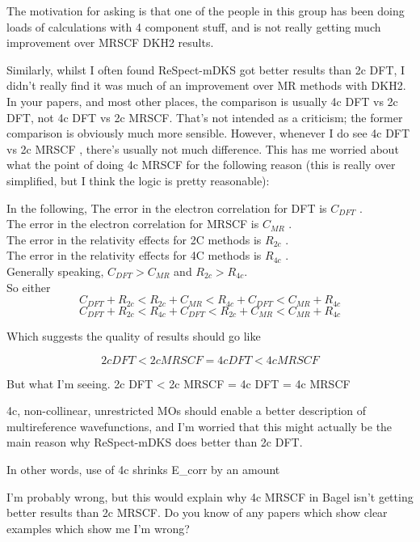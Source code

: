 \documentclass[12pt]{article}
\begin{document}
The motivation for asking is that one of the people in this group has been
doing loads of calculations with 4 component stuff, and is not really getting
much improvement over MRSCF DKH2 results.

Similarly, whilst I often found ReSpect-mDKS got better results than 2c DFT, I
didn't really find it was much of an improvement over MR methods with DKH2. In
your papers, and most other places, the comparison is usually 4c DFT vs 2c DFT,
not 4c DFT vs 2c MRSCF. That's not intended as a criticism; the former
comparison is obviously much more sensible. However, whenever I do see 4c DFT
vs 2c MRSCF , there's usually not much difference. This has me worried about
what the point of doing 4c MRSCF for the following reason (this is really over
simplified, but I think the logic is pretty reasonable):

In the following,
The error in the electron correlation for DFT is $C_{DFT}$ .\\
The error in the electron correlation for MRSCF is $C_{MR}$ .\\
The error in the relativity effects for 2C methods is $R_{2c}$ .\\
The error in the relativity effects for 4C methods is $R_{4c}$ .\\

Generally speaking, $C_{DFT} > C_{MR}$ and $R_{2c}>R_{4c}$. \\

So either
\begin{equation*}
C_{DFT} +R_{2c} <  R_{2c}+C_{MR} < R_{4c}+C_{DFT} < C_{MR} +R_{4c}
\end{equation*}
\begin{equation*}
C_{DFT} +R_{2c} < R_{4c}+C_{DFT} <  R_{2c}+C_{MR}  <C_{MR} +R_{4c}
\end{equation*}

Which suggests the quality of results should go like

\begin{equation*}
2c DFT  < 2c MRSCF  = 4c DFT < 4c MRSCF
\end{equation*}

But what I'm seeing.
2c DFT  < 2c MRSCF  = 4c DFT = 4c MRSCF

4c, non-collinear, unrestricted MOs should enable a better description of
multireference wavefunctions, and I'm worried that this might actually be the
main reason why ReSpect-mDKS does better than 2c DFT.

In other words, use of 4c shrinks E_corr by an amount

 I'm probably wrong, but this would explain why 4c MRSCF in Bagel isn't getting
better results than 2c MRSCF. Do you know of any papers which show clear
examples which show me I'm wrong? 
\end{document}
